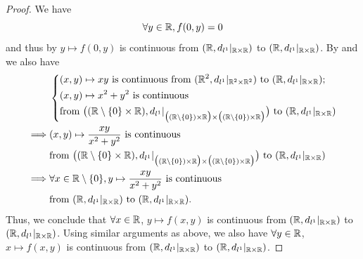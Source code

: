 \begin{proof}
  We have
  \[
    \forall y \in \mathbb{R}, f(0, y) = 0
  \]
  and thus by  \(y \mapsto f(0, y)\) is continuous from \((\mathbb{R}, d_{l^1}|_{\mathbb{R} \times \mathbb{R}})\) to \((\mathbb{R}, d_{l^1}|_{\mathbb{R} \times \mathbb{R}})\).
  By  and  we also have
  \begin{align*}
             & \begin{dcases}
                 (x, y) \mapsto x y \text{ is continuous from } (\R^2, d_{l^1}|_{\R^2 \times \R^2}) \text{ to } (\R, d_{l^1}|_{\R \times \R}); \\
                 (x, y) \mapsto x^2 + y^2 \text{ is continuous}                                                                                \\
                 \text{from } \big((\R \setminus \set{0} \times \R), d_{l^1}|_{\big((\R \setminus \set{0}) \times \R\big) \times \big((\R \setminus \set{0}) \times \R\big)}\big) \text{ to } (\R, d_{l^1}|_{\R \times \R})
               \end{dcases}  \\
    \implies & (x, y) \mapsto \dfrac{xy}{x^2 + y^2} \text{ is continuous}                                                                                                                                                 \\
             & \text{from } \big((\R \setminus \set{0} \times \R), d_{l^1}|_{\big((\R \setminus \set{0}) \times \R\big) \times \big((\R \setminus \set{0}) \times \R\big)}\big) \text{ to } (\R, d_{l^1}|_{\R \times \R}) \\
    \implies & \forall x \in \R \setminus \set{0}, y \mapsto \dfrac{xy}{x^2 + y^2} \text{ is continuous}                                                                                                                  \\
             & \text{from } (\R, d_{l^1}|_{\R \times \R}) \text{ to } (\R, d_{l^1}|_{\R \times \R}).
  \end{align*}
  Thus, we conclude that \(\forall x \in \mathbb{R}\), \(y \mapsto f(x, y)\) is continuous from \((\mathbb{R}, d_{l^1}|_{\mathbb{R} \times \mathbb{R}})\) to \((\mathbb{R}, d_{l^1}|_{\mathbb{R} \times \mathbb{R}})\).
  Using similar arguments as above, we also have \(\forall y \in \mathbb{R}\), \(x \mapsto f(x, y)\) is continuous from \((\mathbb{R}, d_{l^1}|_{\mathbb{R} \times \mathbb{R}})\) to \((\mathbb{R}, d_{l^1}|_{\mathbb{R} \times \mathbb{R}})\).


\end{proof}
